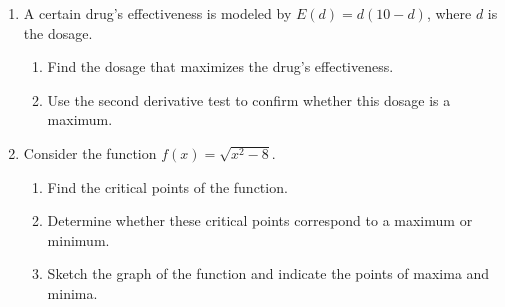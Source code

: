 \documentclass[12pt]{article}
\begin{document}
\begin{enumerate}[itemsep=20pt]
    \item A certain drug's effectiveness is modeled by \( E(d) = d(10 - d) \), where \( d \) is the dosage.
    \begin{enumerate}[label=(\alph*), itemsep=10pt]
        \item Find the dosage that maximizes the drug's effectiveness.
        \item Use the second derivative test to confirm whether this dosage is a maximum.
    \end{enumerate}

    \item Consider the function \( f(x) = \sqrt{x^2 - 8} \).
    \begin{enumerate}[label=(\alph*), itemsep=10pt]
        \item Find the critical points of the function.
        \item Determine whether these critical points correspond to a maximum or minimum.
        \item Sketch the graph of the function and indicate the points of maxima and minima.
    \end{enumerate}
    
\end{enumerate}
\end{document}
